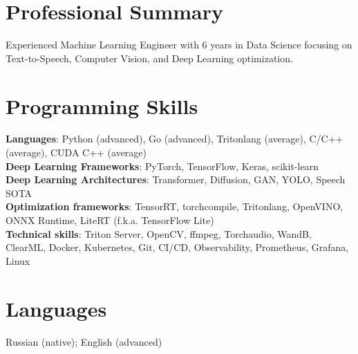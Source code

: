 \section{\sc Professional Summary}
Experienced Machine Learning Engineer with 6 years in Data Science focusing on Text-to-Speech, Computer Vision, and Deep Learning optimization.

\section{\sc Programming Skills}
\textbf{Languages}: Python (advanced), Go (advanced), Tritonlang (average), C/C++ (average), CUDA C++ (average) \\
\textbf{Deep Learning Frameworks}: PyTorch, TensorFlow, Keras, scikit-learn \\
\textbf{Deep Learning Architectures}: Transformer, Diffusion, GAN, YOLO, Speech SOTA \\
\textbf{Optimization frameworks}: TensorRT, torchcompile, Tritonlang, OpenVINO, ONNX Runtime, LiteRT (f.k.a. TensorFlow Lite) \\
\textbf{Technical skills}: Triton Server, OpenCV, ffmpeg, Torchaudio, WandB, ClearML, Docker, Kubernetes, Git, CI/CD, Observability, Prometheus, Grafana, Linux

\section{\sc Languages}
{Russian (native); English (advanced)}

\endinput
